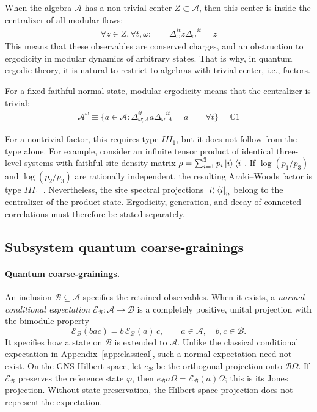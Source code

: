 \documentclass[a4paper,11pt]{article}
\theoremstyle{definition}
\newcommand{\mA}{\mathcal{A}}
\newcommand{\mE}{\mathcal{E}}
\begin{document}
When the algebra $\mA$ has a non-trivial center $Z\subset \mA$, then this center is inside the centralizer of all modular flows:
\begin{align}
    \forall z\in Z,\forall t,\omega:\qquad \Delta_{\omega}^{it}z \Delta_\omega^{-it}=z
\end{align}
This means that these observables are conserved charges, and an obstruction to ergodicity in modular dynamics of arbitrary states. That is why, in quantum ergodic theory, it is natural to restrict to algebras with trivial center, i.e., factors.

For a fixed faithful normal state, modular ergodicity means that the centralizer is trivial:
\begin{align}
    \label{eq:modular-ergodicity}
    \mA^\omega\equiv \{a\in \mA:\Delta_{\omega;A}^{it}a\Delta_{\omega;A}^{-it}=a\qquad \forall t\}=\mathbb{C} 1
\end{align}

For a nontrivial factor, this requires type $III_1$, but it does not follow from the
type alone. For example, consider an infinite tensor product of identical three-level
systems with faithful site density matrix
$\rho=\sum_{i=1}^3p_i\ket{i}\bra{i}$.
If $\log(p_1/p_3)$ and $\log(p_2/p_3)$ are rationally independent, the resulting
Araki--Woods factor is type $III_1$~\cite{ArakiWoods1968}.
Nevertheless, the site spectral projections $\ket{i}\bra{i}_n$ belong to the
centralizer of the product state. Ergodicity, generation, and decay of connected
correlations must therefore be stated separately.

\subsection{Subsystem quantum coarse-grainings}
\label{subsec:quantum-coarse}


\paragraph{Quantum coarse-grainings.}
An inclusion $\mathcal B\subseteq\mathcal A$ specifies the retained observables.
When it exists, a \emph{normal conditional expectation}
$\mE_{\mathcal B}:\mathcal A\to\mathcal B$ is a completely positive, unital projection
with the bimodule property
\begin{equation}
 \mE_{\mathcal B}(bac)=b\,\mE_{\mathcal B}(a)\,c,
 \qquad a\in\mathcal A,\quad b,c\in\mathcal B.
 \label{eq:CE-bimodular}
\end{equation}
It specifies how a state on $\mathcal B$ is extended to $\mathcal A$.
Unlike the classical conditional expectation in Appendix~\ref{app:classical},
such a normal expectation need not exist. On the GNS Hilbert space, let $e_{\mathcal B}$
be the orthogonal projection onto $\overline{\mathcal B\Omega}$.
If $\mE_{\mathcal B}$ preserves the reference state $\varphi$, then
$e_{\mathcal B}a\Omega=\mE_{\mathcal B}(a)\Omega$; this is its Jones projection.
Without state preservation, the Hilbert-space projection does not represent the expectation.
\end{document}
